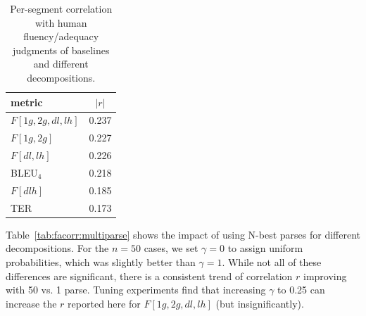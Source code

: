 \documentclass{kluwer}    %
\begin{document}
\begin{article}
\begin{table}
  \caption{Per-segment correlation with
    human fluency/adequacy judgments of baselines and different decompositions.}
  \label{tab:facorr:subgraphs}
  \begin{tabular*}{2.5in}{lr}
    \hline
    metric  &    \multicolumn{1}{c}{$|r|$} \\
    \hline
    $F[1g,2g,dl,lh]$      &  0.237 \\
    $F[1g,2g]$            & 0.227 \\
    $F[dl,lh]$ &   0.226 \\
    BLEU$_4$ &   0.218 \\
    $F[dlh]$ &     0.185 \\
    TER &      0.173 \\
    \hline
  \end{tabular*}
\end{table}



Table~\ref{tab:facorr:multiparse} shows the impact of using N-best
parses for different decompositions.
For the $n=50$ cases, we set $\gamma=0$ to assign uniform
probabilities, which was slightly better than $\gamma=1$.
While not all of these differences are significant, there is a
consistent trend of correlation $r$ improving with 50 vs. 1 parse.  Tuning
experiments find that increasing $\gamma$ to 0.25 can increase the $r$
reported here for $F[1g,2g,dl,lh]$ (but insignificantly).


\end{article}
\end{document}
